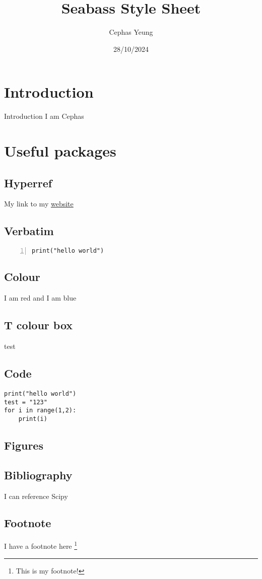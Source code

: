 \documentclass[twoside]{report}
\title{Seabass Style Sheet}
\author{Cephas Yeung}
\date{28/10/2024}
\begin{document}
\maketitle
\tableofcontents

\chapter*{Introduction}
Introduction I am Cephas

\chapter{Useful packages}

\section{Hyperref}
My link to my \href{cephas.monster}{website}

\section{Verbatim}
\begin{Verbatim}[numbers=left, frame=single]
print("hello world")
\end{Verbatim}

\section{Colour}
I am {\color{red} red} and I am {\color{blue} blue}

\section{T colour box}

\begin{tcolorbox}[colback=red!5!white,colframe=red!75!black,title=My nice heading]
test
\end{tcolorbox}
\section{Code}
\begin{verbatim}
print("hello world")
test = "123"
for i in range(1,2):
    print(i)
\end{verbatim}

\section{Figures}


\section{Bibliography}

I can reference Scipy \cite{2020SciPy-NMeth}

\section{Footnote}

I have a footnote here \footnote[1]{This is my footnote!}



\end{document}
